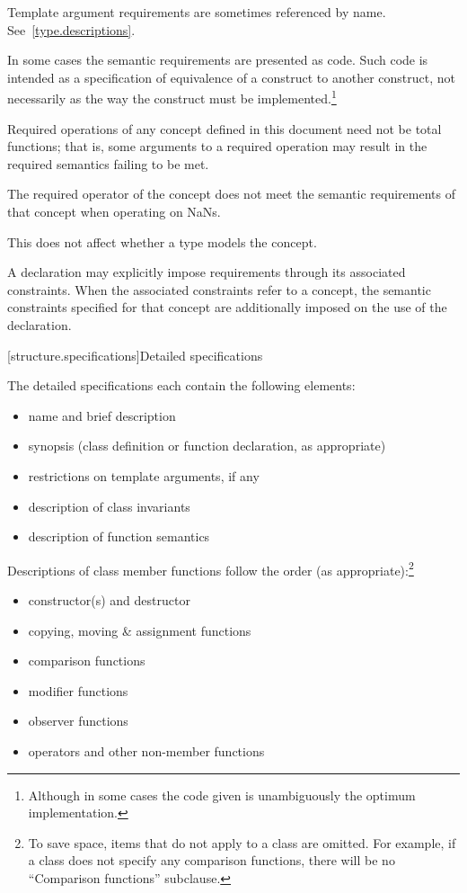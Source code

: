 \pnum
Template argument requirements are sometimes referenced by name.
See~\ref{type.descriptions}.

\pnum
In some cases the semantic requirements are presented as \Cpp{} code.
Such code is intended as a
specification of equivalence of a construct to another construct, not
necessarily as the way the construct
must be implemented.\footnote{Although in some cases the code given is
unambiguously the optimum implementation.}

\pnum
Required operations of any concept defined in this document need not be
total functions; that is, some arguments to a required operation may
result in the required semantics failing to be met.
\begin{example}
The required \tcode{<} operator of the 
concept does not meet the
semantic requirements of that concept when operating on NaNs.
\end{example}
This does not affect whether a type models the concept.

\pnum
A declaration may explicitly impose requirements through its associated
constraints. When the associated constraints refer to a
concept, the semantic constraints specified for that concept
are additionally imposed on the use of the declaration.

[structure.specifications]{Detailed specifications}

\pnum
The detailed specifications each contain the following elements:%

\begin{itemize}
\item name and brief description
\item synopsis (class definition or function declaration, as appropriate)
\item restrictions on template arguments, if any
\item description of class invariants
\item description of function semantics
\end{itemize}

\pnum
Descriptions of class member functions follow the order (as
appropriate):\footnote{To save space, items that do not apply to a class are omitted.
For example, if a class does not specify any comparison functions, there
will be no ``Comparison functions'' subclause.}

\begin{itemize}
\item constructor(s) and destructor
\item copying, moving \& assignment functions
\item comparison functions
\item modifier functions
\item observer functions
\item operators and other non-member functions
\end{itemize}

